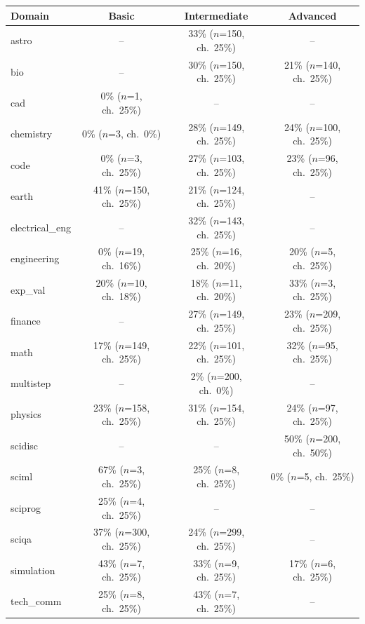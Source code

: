 \begin{tabular}{lccc}
\toprule
Domain & Basic & Intermediate & Advanced \\
\midrule
astro & -- & 33\% \scriptsize{($n$=150, ch.\ 25\%)} & -- \\
bio & -- & 30\% \scriptsize{($n$=150, ch.\ 25\%)} & 21\% \scriptsize{($n$=140, ch.\ 25\%)} \\
cad & 0\% \scriptsize{($n$=1, ch.\ 25\%)} & -- & -- \\
chemistry & 0\% \scriptsize{($n$=3, ch.\ 0\%)} & 28\% \scriptsize{($n$=149, ch.\ 25\%)} & 24\% \scriptsize{($n$=100, ch.\ 25\%)} \\
code & 0\% \scriptsize{($n$=3, ch.\ 25\%)} & 27\% \scriptsize{($n$=103, ch.\ 25\%)} & 23\% \scriptsize{($n$=96, ch.\ 25\%)} \\
earth & 41\% \scriptsize{($n$=150, ch.\ 25\%)} & 21\% \scriptsize{($n$=124, ch.\ 25\%)} & -- \\
electrical\_eng & -- & 32\% \scriptsize{($n$=143, ch.\ 25\%)} & -- \\
engineering & 0\% \scriptsize{($n$=19, ch.\ 16\%)} & 25\% \scriptsize{($n$=16, ch.\ 20\%)} & 20\% \scriptsize{($n$=5, ch.\ 25\%)} \\
exp\_val & 20\% \scriptsize{($n$=10, ch.\ 18\%)} & 18\% \scriptsize{($n$=11, ch.\ 20\%)} & 33\% \scriptsize{($n$=3, ch.\ 25\%)} \\
finance & -- & 27\% \scriptsize{($n$=149, ch.\ 25\%)} & 23\% \scriptsize{($n$=209, ch.\ 25\%)} \\
math & 17\% \scriptsize{($n$=149, ch.\ 25\%)} & 22\% \scriptsize{($n$=101, ch.\ 25\%)} & 32\% \scriptsize{($n$=95, ch.\ 25\%)} \\
multistep & -- & 2\% \scriptsize{($n$=200, ch.\ 0\%)} & -- \\
physics & 23\% \scriptsize{($n$=158, ch.\ 25\%)} & 31\% \scriptsize{($n$=154, ch.\ 25\%)} & 24\% \scriptsize{($n$=97, ch.\ 25\%)} \\
scidisc & -- & -- & 50\% \scriptsize{($n$=200, ch.\ 50\%)} \\
sciml & 67\% \scriptsize{($n$=3, ch.\ 25\%)} & 25\% \scriptsize{($n$=8, ch.\ 25\%)} & 0\% \scriptsize{($n$=5, ch.\ 25\%)} \\
sciprog & 25\% \scriptsize{($n$=4, ch.\ 25\%)} & -- & -- \\
sciqa & 37\% \scriptsize{($n$=300, ch.\ 25\%)} & 24\% \scriptsize{($n$=299, ch.\ 25\%)} & -- \\
simulation & 43\% \scriptsize{($n$=7, ch.\ 25\%)} & 33\% \scriptsize{($n$=9, ch.\ 25\%)} & 17\% \scriptsize{($n$=6, ch.\ 25\%)} \\
tech\_comm & 25\% \scriptsize{($n$=8, ch.\ 25\%)} & 43\% \scriptsize{($n$=7, ch.\ 25\%)} & -- \\
\bottomrule
\end{tabular}
